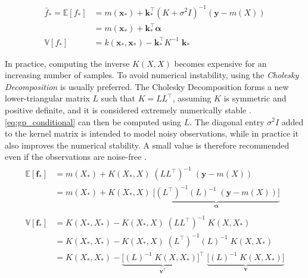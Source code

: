 \begin{subequations}\label{eq:gp_conditional_simple}
\begin{align}
    \bar{f}_* = \mathbb{E}[f_*]  &= m(\boldsymbol{x}_*) + \boldsymbol{k}_*^\intercal ( K + \sigma^2 I)^{-1} (\boldsymbol{y} - m(X))\label{eq:gp_conditional_mean_simple}\\
     &= m(\boldsymbol{x}_*) + \boldsymbol{k}_*^\intercal \boldsymbol{\alpha}\\
    \mathbb{V}[f_*] &= k(\boldsymbol{x}_*, \boldsymbol{x}_*) - \boldsymbol{k}_*^\intercal K^{-1} \; \boldsymbol{k}_*\label{eq:gp_conditional_var_simple}
\end{align}
\end{subequations}

In practice, computing the inverse $K(X, X)$ becomes expensive for an increasing number of samples. To avoid numerical instability, using the \textit{Cholesky Decomposition} is usually preferred. The Cholesky Decomposition forms a new lower-triangular matrix $L$ such that $K = L L^\intercal$, assuming $K$ is symmetric and positive definite, and it is considered extremely numerically stable \cite{rasmussen}. \cref{eq:gp_conditional} can then be computed using $L$. The diagonal entry $\sigma^2 I$ added to the kernel matrix is intended to model noisy observations, while in practice it also improves the numerical stability. A small value is therefore recommended even if the observations are noise-free \cite{scikit-learn}.
\begin{subequations}
\begin{align}
    \begin{split}
    \mathbb{E}[{\boldsymbol{f}}_*] &= m(X_*) + K(X_*, X) \; (L L^\intercal)^{-1} \; (\boldsymbol{y} - m(X))\\ &= m(X_*) + K(X_*, X) \; \underbrace{\big[(L^\intercal)^{-1} (L)^{-1}  \; (\boldsymbol{y} - m(X))\big]}_{\boldsymbol{\alpha}}
    \end{split}\\
    \begin{split}
    \mathbb{V}[\boldsymbol{f}_*] &= K(X_*, X_*) - K(X_*, X) \; (L L^\intercal)^{-1} \; K(X, X_*)\\
    &= K(X_*, X_*) - K(X_*, X) \; (L^\intercal)^{-1} (L)^{-1} \; K(X, X_*)\\
    &= K(X_*, X_*) - \underbrace{\big[(L)^{-1} \; K(X, X_*)\big]^\intercal}_{\boldsymbol{v^\intercal}} \; \underbrace{\big[(L)^{-1} \; K(X, X_*)\big]}_{\boldsymbol{v}}
    \end{split}
\end{align}
\end{subequations}

